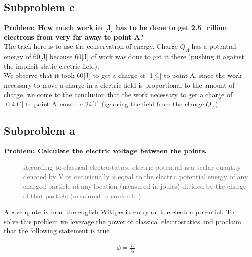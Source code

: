 \documentclass[paper=a4, fontsize=11pt]{scrartcl} %
\numberwithin{equation}{section} %
\numberwithin{figure}{section} %
\numberwithin{table}{section} %
\begin{document}
\subsection{Subproblem c}

\textbf{Problem: How much work in [J] has to be done to get 2.5 trillion electrons from very far away to point A?}
\\

The trick here is to use the conservation of energy. Charge $Q_A$ has a potential
energy of 60[J] because 60[J] of work was done to get it there (pushing it against the implicit static electric field).
\\

We observe that it took 60[J] to get a charge of -1[C] to point A. since the work necessary to move a
charge in a electric field is proportional to the amount of charge, we come to the conclusion
that the work necessary to get a charge of -0.4[C] to point A must be 24[J] (ignoring the field from the charge $Q_A$).

\subsection{Subproblem a}
\textbf{Problem: Calculate the electric voltage between the points.}

\begin{quotation}
According to classical electrostatics, electric potential is a scalar quantity 
denoted by V or occasionally $\phi$ equal to the electric potential energy of any 
charged particle at any location (measured in joules) divided by the charge of that 
particle (measured in coulombs).
\end{quotation}

Above qoute is from the english Wikipedia entry on the electric potential.
To solve this problem we leverage the power of classical electrostatics and proclaim that the
following statement is true.

\begin{align} \label{eq:8}
\phi = \frac{W}{Q}
\end{align}
\end{document}
